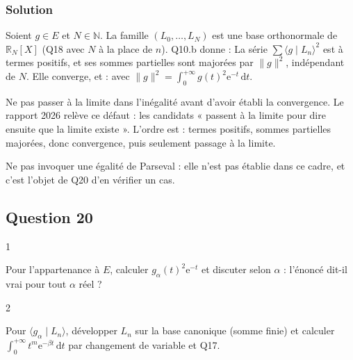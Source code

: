 \documentclass[11pt,a4paper]{article}
\newcommand{\equationajustee}[1]{%
  \sbox{\boiteequation}{$\displaystyle #1$}%
  \ifdim\wd\boiteequation>\linewidth
    \[\resizebox{\linewidth}{!}{\usebox{\boiteequation}}\]%
  \else
    \[#1\]%
  \fi}
\begin{document}
\hypertarget{solution-18}{%
\subsubsection{Solution}\label{solution-18}}

Soient \(g\in E\) et \(N\in\mathbb N\). La famille \((L_0,\dots,L_N)\) est une base orthonormale de \(\mathbb R_N[X]\) (Q18 avec \(N\) à la place de \(n\)). Q10.b donne :
\equationajustee{\sum_{k=0}^N\langle g\mid L_k\rangle^2\le\|g\|^2.}
La série \(\sum\langle g\mid L_n\rangle^2\) est à termes positifs, et ses sommes partielles sont majorées par \(\|g\|^2\), indépendant de \(N\). Elle converge, et :
\equationajustee{\boxed{\sum_{n=0}^{+\infty}\langle g\mid L_n\rangle^2\le\|g\|^2}}
avec \(\|g\|^2=\int_0^{+\infty}g(t)^2\mathrm e^{-t}\,\mathrm dt\).

\begin{piege}

Ne pas passer à la limite dans l'inégalité avant d'avoir établi la convergence. Le rapport 2026 relève ce défaut : les candidats « passent à la limite pour dire ensuite que la limite existe ». L'ordre est : termes positifs, sommes partielles majorées, donc convergence, puis seulement passage à la limite.

\end{piege}

\begin{piege}

Ne pas invoquer une égalité de Parseval : elle n'est pas établie dans ce cadre, et c'est l'objet de Q20 d'en vérifier un cas.

\end{piege}

\hypertarget{question-20}{%
\subsection{Question 20}\label{question-20}}

\begin{indication}{1}

Pour l'appartenance à \(E\), calculer \(g_\alpha(t)^2\mathrm e^{-t}\) et discuter selon \(\alpha\) : l'énoncé dit-il vrai pour tout \(\alpha\) réel ?

\end{indication}

\begin{indication}{2}

Pour \(\langle g_\alpha\mid L_n\rangle\), développer \(L_n\) sur la base canonique (somme finie) et calculer \(\int_0^{+\infty}t^m\mathrm e^{-\beta t}\,\mathrm dt\) par changement de variable et Q17.

\end{indication}
\end{document}
